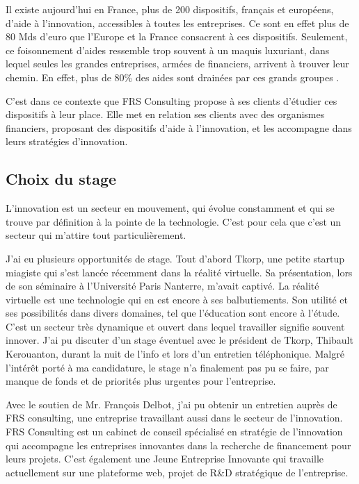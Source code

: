 \documentclass[french]{article}
\begin{document}
{Il existe aujourd'hui en France, plus de 200 dispositifs, français et européens, d'aide à l'innovation, accessibles à toutes les entreprises. Ce sont en effet plus de 80 Mds d'euro que l'Europe et la France consacrent à ces dispositifs. Seulement, ce foisonnement d'aides ressemble trop souvent à un maquis luxuriant, dans lequel seules les grandes entreprises, armées de financiers, arrivent à trouver leur chemin. En effet, plus de 80\% des aides sont drainées par ces grands groupes \cite{strategie-gouv-innov, eurostat}.

C'est dans ce contexte que FRS Consulting propose à ses clients d'étudier ces dispositifs à leur place. Elle met en relation ses clients avec des organismes financiers, proposant des dispositifs d'aide à l'innovation, et les accompagne dans leurs stratégies d'innovation.

\subsection{Choix du stage}

L'innovation est un secteur en mouvement, qui évolue constamment et qui se trouve par définition à la pointe de la technologie. C'est pour cela que c'est un secteur qui m'attire tout particulièrement.

J'ai eu plusieurs opportunités de stage. Tout d'abord Tkorp, une petite startup miagiste qui s'est lancée récemment dans la réalité virtuelle. Sa présentation, lors de son séminaire à l'Université Paris Nanterre, m'avait captivé. 
\newline{}
La réalité virtuelle est une technologie qui en est encore à ses balbutiements. Son utilité et ses possibilités dans divers domaines, tel que l'éducation sont encore à l'étude. C'est un secteur très dynamique et ouvert dans lequel travailler signifie souvent innover.
\newline{}
J'ai pu discuter d'un stage éventuel avec le président de Tkorp, Thibault Kerouanton, durant la nuit de l'info et lors d'un entretien téléphonique.
\newline{}
Malgré l'intérêt porté à ma candidature, le stage n'a finalement pas pu se faire, par manque de fonds et de priorités plus urgentes pour l'entreprise.

Avec le soutien de Mr. François Delbot, j'ai pu obtenir un entretien auprès de FRS consulting, une entreprise travaillant aussi dans le secteur de l'innovation.
\newline{}
FRS Consulting est un cabinet de conseil spécialisé en stratégie de l’innovation qui accompagne les entreprises innovantes dans la recherche de financement pour leurs projets. C'est également une Jeune Entreprise Innovante qui travaille actuellement sur une plateforme web, projet de R\&D stratégique de l'entreprise.

}
\end{document}
